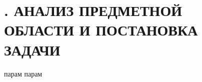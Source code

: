 \sectionbreak \section*{
  \cyrillicfont 
  \fontsize{14pt}{0pt}\selectfont
  \englishfont 
  . АНАЛИЗ ПРЕДМЕТНОЙ ОБЛАСТИ И ПОСТАНОВКА ЗАДАЧИ
}

\titlespace

{\cyrillicfont 
\fontsize{13pt}{16.25pt}\selectfont 
\englishfont 

  \par \redline парам парам
  \par
}

